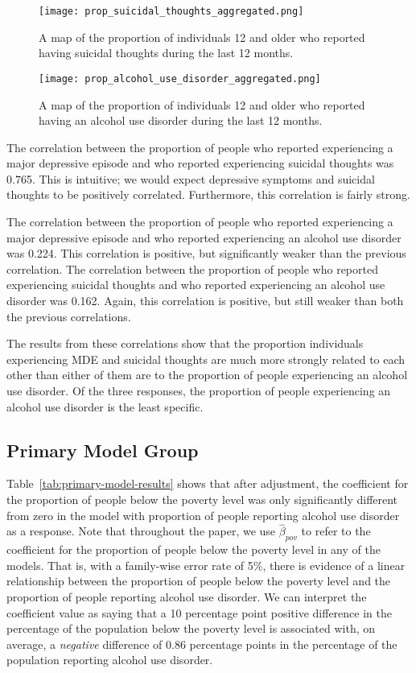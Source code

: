 \documentclass{article}
\begin{document}
\begin{figure}[!htb]
    \centering
    \texttt{[image: prop\_suicidal\_thoughts\_aggregated.png]}
    \caption{\label{fig:map-suicidal-thoughts}
    A map of the proportion of individuals 12 and older who
	reported having suicidal thoughts during the last 12 months.}
\end{figure}

\begin{figure}[!htb]
    \centering
    \texttt{[image: prop\_alcohol\_use\_disorder\_aggregated.png]}
    \caption{\label{fig:map-alcohol-use}
    A map of the proportion of individuals 12 and older who
	reported having an alcohol use disorder during the last 12 months.}
\end{figure}

The correlation between the proportion of people who reported experiencing
a major depressive episode and
who reported experiencing suicidal thoughts was
0.765.
This is intuitive; we would expect depressive symptoms and suicidal thoughts
to be positively correlated.
Furthermore, this correlation is fairly strong.

The correlation between the proportion of people who reported experiencing
a major depressive episode and
who reported experiencing an alcohol use disorder was
0.224.
This correlation is positive, but significantly weaker than
the previous correlation.
The correlation between the proportion of people who reported experiencing
suicidal thoughts and
who reported experiencing an alcohol use disorder was
0.162.
Again, this correlation is positive, but still weaker than
both the previous correlations.

The results from these correlations show that the proportion individuals
experiencing MDE and suicidal thoughts are much more strongly related to each
other than either of them are to the proportion of people experiencing
an alcohol use disorder.
Of the three responses, the proportion of people experiencing an
alcohol use disorder is the least specific.

\subsection{Primary Model Group}

Table~\ref{tab:primary-model-results} shows that
after adjustment,
the coefficient for the proportion of people below the poverty level
was only significantly different from zero
in the model with proportion of people reporting
alcohol use disorder as a response.
Note that throughout the paper,
we use $\hat{\beta}_{pov}$ to refer to the
coefficient for the proportion of people below the poverty level in any of the
models.
That is, with a family-wise error rate of 5\%,
there is evidence of a linear relationship between
the proportion of people below the poverty level
and the proportion of people reporting alcohol use disorder.
We can interpret the coefficient value as saying that
a 10 percentage point positive difference in the percentage of the
population below the poverty level
is associated with, on average,
a \textit{negative} difference of 0.86 percentage points
in the percentage of the population
reporting alcohol use disorder.
\end{document}
